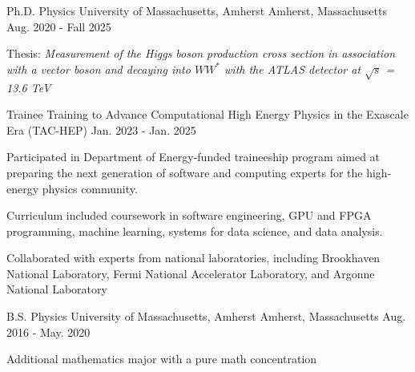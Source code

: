 

\begin{cventries}

  \cventry
    {Ph.D. Physics} %
    {University of Massachusetts, Amherst} %
    {Amherst, Massachusetts} %
    {Aug. 2020 - Fall 2025} %
    {
      \begin{cvitems} %
        \item {Thesis: \textit{Measurement of the Higgs boson production cross section in association with a vector boson and decaying into $WW^{*}$ with the ATLAS detector at $\sqrt{s}$ = 13.6 TeV}}
      \end{cvitems}
    }
  \cventry
    {Trainee} %
    {Training to Advance Computational High Energy Physics in the Exascale Era (TAC-HEP)} %
    {} %
    {Jan. 2023 - Jan. 2025} %
    {
      \begin{cvitems} %
        \item {Participated in Department of Energy-funded traineeship program aimed at preparing the next generation of software and computing experts for the high-energy physics community.}
        \item {Curriculum included coursework in software engineering, GPU and FPGA programming, machine learning, systems for data science, and data analysis.}
        \item {Collaborated with experts from national laboratories, including Brookhaven National Laboratory, Fermi National Accelerator Laboratory, and Argonne National Laboratory}
      \end{cvitems}
    }
  \cventry
    {B.S. Physics} %
    {University of Massachusetts, Amherst} %
    {Amherst, Massachusetts} %
    {Aug. 2016 - May. 2020} %
    {
      \begin{cvitems} %
        \item {Additional mathematics major with a pure math concentration}
      \end{cvitems}
    }

\end{cventries}
